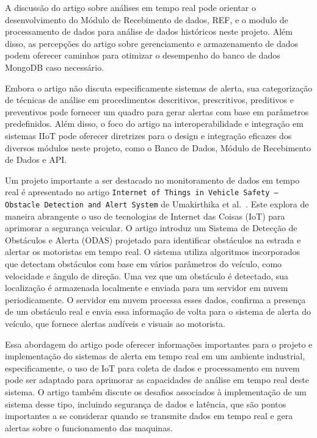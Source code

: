 A discussão do artigo sobre análises em tempo real pode orientar o desenvolvimento do Módulo de Recebimento de dados, REF, e o modulo de processamento de dados para análise de dados históricos neste projeto. Além disso, as percepções do artigo sobre gerenciamento e armazenamento de dados podem oferecer caminhos para otimizar o desempenho do banco de dados MongoDB caso necessário.

Embora o artigo não discuta especificamente sistemas de alerta, sua categorização de técnicas de análise em procedimentos descritivos, prescritivos, preditivos e preventivos pode fornecer um quadro para gerar alertas com base em parâmetros predefinidos. Além disso, o foco do artigo na interoperabilidade e integração em sistemas IIoT pode oferecer diretrizes para o design e integração eficazes dos diversos módulos neste projeto, como o Banco de Dados, Módulo de Recebimento de Dados e API.


Um projeto importante a ser destacado no monitoramento de dados em tempo real é apresentado no artigo \texttt{Internet of Things in Vehicle Safety – Obstacle Detection and Alert System} de Umakirthika et al.~\cite{Umakirthika2018}. Este explora de maneira abrangente o uso de tecnologias de Internet das Coisas (IoT) para aprimorar a segurança veicular. O artigo introduz um Sistema de Detecção de Obstáculos e Alerta (ODAS) projetado para identificar obstáculos na estrada e alertar os motoristas em tempo real. O sistema utiliza algoritmos incorporados que detectam obstáculos com base em vários parâmetros do veículo, como velocidade e ângulo de direção. Uma vez que um obstáculo é detectado, sua localização é armazenada localmente e enviada para um servidor em nuvem periodicamente. O servidor em nuvem processa esses dados, confirma a presença de um obstáculo real e envia essa informação de volta para o sistema de alerta do veículo, que fornece alertas audíveis e visuais ao motorista.

Essa abordagem do artigo pode oferecer informações importantes para o projeto e implementação do sistemas de alerta em tempo real em um ambiente industrial, especificamente, o uso de IoT para coleta de dados e processamento em nuvem pode ser adaptado para aprimorar as capacidades de análise em tempo real deste sistema. O artigo também discute os desafios associados à implementação de um sistema desse tipo, incluindo segurança de dados e latência, que são pontos importantes a se considerar quando se transmite dados em tempo real e gera alertas sobre o funcionamento das maquinas.

